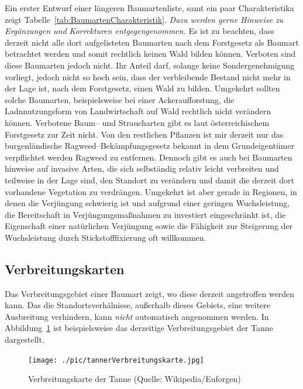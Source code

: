 \documentclass[twocolumn]{scrartcl}
\begin{document}
Ein erster Entwurf einer längeren Baumartenliste, samt ein paar
Charakteristika zeigt
Tabelle~\ref{tab:BaumartenCharakteristik}. \emph{Dazu werden gerne
  Hinweise zu Ergänzungen und Korrekturen entgegengenommen.}  Es ist
zu beachten, dass derzeit nicht alle dort aufgelisteten Baumarten nach
dem Forstgesetz als Baumart betrachtet werden und somit rechtlich
keinen Wald bilden können. Verboten sind diese Baumarten jedoch
nicht. Ihr Anteil darf, solange keine Sondergenehmigung vorliegt,
jedoch nicht so hoch sein, dass der verbleibende Bestand nicht mehr in
der Lage ist, nach dem Forstgesetz, einen Wald zu bilden. Umgekehrt
sollten solche Baumarten, beispielsweise bei einer Ackeraufforstung,
die Ladnnutzungsform von Landwirtschaft auf Wald rechtlich nicht
verändern können. Verbotene Baum-- und Straucharten gibt es laut
österreichischem Forstgesetz zur Zeit nicht. Von den restlichen
Pflanzen ist mir derzeit nur das burgenländische
Ragweed--Bekämpfungsgesetz bekannt in dem Grundeigentümer verpflichtet
werden Ragweed zu entfernen. Dennoch gibt es auch bei Baumarten
hinweise auf invasive Arten, die sich selbständig relativ leicht
verbreiten und teilweise in der Lage sind, den Standort zu verändern
und damit die derzeit dort vorhandene Vegetation zu
verdrängen. Umgekehrt ist aber gerade in Regionen, in denen die
Verjüngung schwierig ist und aufgrund einer geringen Wuchsleistung,
die Bereitschaft in Verjüngungsmaßnahmen zu investiert eingeschränkt
ist, die Eigenschaft einer natürlichen Verjüngung sowie die Fähigkeit
zur Steigerung der Wuchsleistung durch Stickstofffixierung oft
willkommen.


\subsection{Verbreitungskarten}
\label{sec:verbreitungskarten}

Das Verbreitungsgebiet einer Baumart zeigt, wo diese derzeit
angetroffen werden kann. Das die Standortsverhälnisse, außerhalb
dieses Gebiets, eine weitere Ausbreitung verhindern, kann \emph{nicht}
automatisch angenommen werden. In
Abbildung~\ref{fig:tannerVerbreitungskarte} ist beispielsweise das
derzeitige Verbreitungsgebiet der Tanne dargestellt.

\begin{figure}[htbp]
  \centering
  \texttt{[image: ./pic/tannerVerbreitungskarte.jpg]}
  \caption{Verbreitungskarte der Tanne (Quelle: Wikipedia/Euforgen)}
  \label{fig:tannerVerbreitungskarte}
\end{figure}
\end{document}
